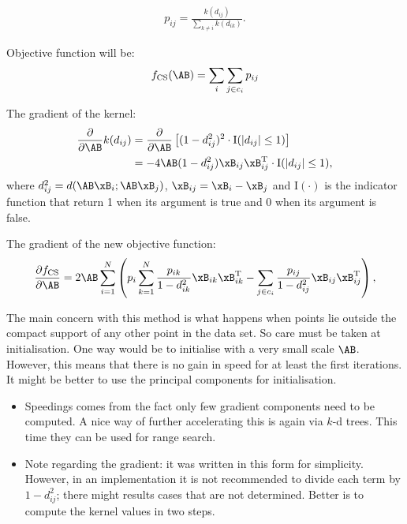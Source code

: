 	\begin{align}
		p_{ij} = \frac{k(d_{ij})}{\sum_{k\neq i} k(d_{ik})}.
	\end{align}
	
	Objective function will be: 
	\begin{align}
		f_\text{CS}(\AB) = \sum_{i}\sum_{j\in c_i} p_{ij}
	\end{align}
	
	The gradient of the kernel:
	\begin{align}
		\frac{\partial}{\partial\AB}k(d_{ij}) 
		&= 
	\frac{\partial}{\partial\AB}\left[(1-d_{ij}^2)^2\cdot\mathrm{I}(\left|d_{ij}\right|\le
	1)\right]\\
		&= -4\AB(1-d_{ij}^2)  \xB_{ij} \xB_{ij}^\mathrm{T} \cdot
	\mathrm{I}(\left|d_{ij}\right|\le 1),
	\end{align}
	where $d_{ij}^2 = d(\AB\xB_i;\AB\xB_j)$, $\xB_{ij}=\xB_i-\xB_j$ and
	$\mathrm{I}(\cdot)$ is the indicator function that return 1 when its argument is
	true and 0 when its argument is false.
	
	The gradient of the new objective function:
	\begin{align}
		\frac{\partial f_\text{CS}}{\partial \AB}=2\AB\sum_{i=1}^{N}
		\left(
		p_i \sum_{k=1}^N \frac{p_{ik}}{1-d_{ik}^2} \xB_{ik}\xB_{ik}^{\textrm{T}}
		- \sum_{j\in c_i} \frac{p_{ij}}{1-d_{ij}^2}\xB_{ij}\xB_{ij}^{\textrm{T}} 
		\right)
		\label{eq:nca-cs-grad},
	\end{align}
	
	The main concern with this method is what happens when points lie outside the
	compact support of any other point in the data set. So care must be taken at
	initialisation. One way would be to initialise with a very small scale $\AB$.
	However, this means that there is no gain in speed for at least the first
	iterations. It might be better to use the principal components for
	initialisation. 
	
	\begin{itemize}
		\item Speedings comes from the fact only few gradient components need to be
	computed. A nice way of further accelerating this is again via $k$-d trees. This
	time they can be used for range search. 
		\item Note regarding the gradient: it was written in this form for simplicity.
	However, in an implementation it is not recommended to divide each term by
	$1-d_{ij}^2$; there might results cases that are not determined. Better is to
	compute the kernel values in two steps.
	\end{itemize}

